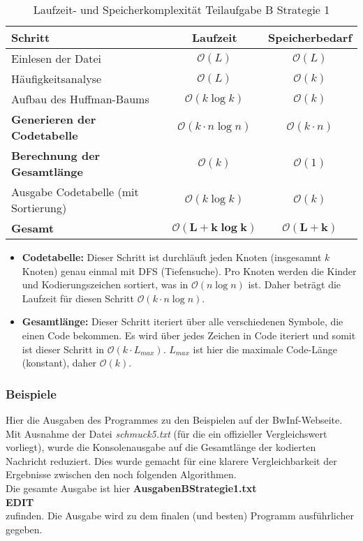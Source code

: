 \documentclass[a4paper,10pt,ngerman]{scrartcl}
\begin{document}
\begin{table}[H]
\centering
\begin{tabular}{|l|c|c|}
\hline
\textbf{Schritt} & \textbf{Laufzeit} & \textbf{Speicherbedarf} \\
\hline
Einlesen der Datei & $\mathcal{O}(L)$ & $\mathcal{O}(L)$ \\
Häufigkeitsanalyse & $\mathcal{O}(L)$ & $\mathcal{O}(k)$ \\
Aufbau des Huffman-Baums & $\mathcal{O}(k \log k)$ & $\mathcal{O}(k)$ \\
\textbf{Generieren der Codetabelle} & $\mathcal{O}(k \cdot n \log n)$ & $\mathcal{O}(k \cdot n)$ \\
\textbf{Berechnung der Gesamtlänge} & $\mathcal{O}(k)$ & $\mathcal{O}(1)$ \\
Ausgabe Codetabelle (mit Sortierung) & $\mathcal{O}(k \log k)$ & $\mathcal{O}(k)$ \\
\hline
\textbf{Gesamt} & $\boldsymbol{\mathcal{O}(L + k \log k)}$ & $\boldsymbol{\mathcal{O}(L + k)}$ \\
\hline
\end{tabular}
\caption{Laufzeit- und Speicherkomplexität Teilaufgabe B Strategie 1}
\end{table}

\vspace{1em}

\begin{itemize}
  \item \textbf{Codetabelle:} Dieser Schritt ist durchläuft jeden Knoten (insgesamnt $k$ Knoten) genau einmal mit DFS (Tiefensuche). Pro Knoten werden die Kinder und Kodierungszeichen sortiert, was in $\mathcal{O}(n \log n)$ ist. Daher beträgt die Laufzeit für diesen Schritt $\mathcal{O}(k \cdot n \log n)$.

  \item \textbf{Gesamtlänge:} Dieser Schritt iteriert über alle verschiedenen Symbole, die einen Code bekommen. Es wird über jedes Zeichen in Code iteriert und somit ist dieser Schritt in $\mathcal{O}(k \cdot L_{max})$. $L_{max}$ ist hier die maximale Code-Länge (konstant), daher $\mathcal{O}(k)$.
\end{itemize}
\subsubsection{Beispiele}
Hier die Ausgaben des Programmes zu den Beispielen auf der BwInf-Webseite. Mit Ausnahme der Datei \textit{schmuck5.txt} (für die ein offizieller Vergleichswert vorliegt), wurde die Konsolenausgabe auf die Gesamtlänge der kodierten Nachricht reduziert. Dies wurde gemacht für eine klarere Vergleichbarkeit der Ergebnisse zwischen den noch folgenden Algorithmen. \\Die gesamte Ausgabe ist hier \textbf{AusgabenBStrategie1.txt} \\ \newline \textbf{EDIT} \\ \newline zufinden. 
Die Ausgabe wird zu dem finalen (und besten) Programm ausführlicher gegeben. 
\end{document}
